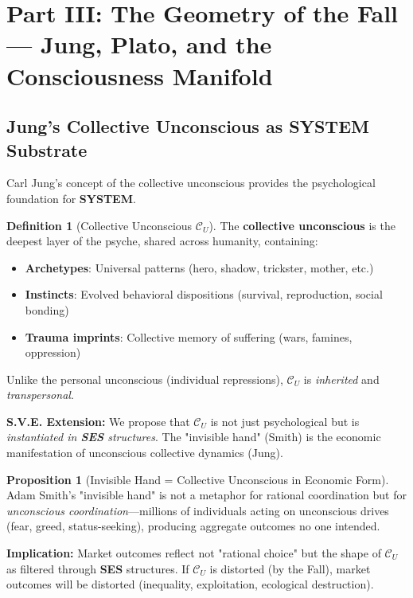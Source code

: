 \documentclass[11pt,a4paper]{article}
\newcommand{\SYSTEM}{\textbf{SYSTEM}}
\newcommand{\SES}{\textbf{SES}}
\newcommand{\CU}{$\mathcal{C}_U$}
\theoremstyle{definition}
\newtheorem{definition}{Definition}[section]
\newtheorem{proposition}{Proposition}[section]
\theoremstyle{remark}
\begin{document}

\section{Part III: The Geometry of the Fall — Jung, Plato, and the Consciousness Manifold}

\subsection{Jung's Collective Unconscious as \SYSTEM{} Substrate}

Carl Jung's concept of the collective unconscious \cite{jung_collective_unconscious} provides the psychological foundation for \SYSTEM{}.

\begin{definition}[Collective Unconscious \CU{}]
\label{def:collective_unconscious}
The \textbf{collective unconscious} is the deepest layer of the psyche, shared across humanity, containing:
\begin{itemize}
\item \textbf{Archetypes}: Universal patterns (hero, shadow, trickster, mother, etc.)
\item \textbf{Instincts}: Evolved behavioral dispositions (survival, reproduction, social bonding)
\item \textbf{Trauma imprints}: Collective memory of suffering (wars, famines, oppression)
\end{itemize}

Unlike the personal unconscious (individual repressions), \CU{} is \textit{inherited} and \textit{transpersonal}.
\end{definition}

\textbf{S.V.E. Extension:} We propose that \CU{} is not just psychological but is \textit{instantiated in \SES{} structures}. The "invisible hand" (Smith) is the economic manifestation of unconscious collective dynamics (Jung).

\begin{proposition}[Invisible Hand = Collective Unconscious in Economic Form]
\label{prop:invisible_hand_unconscious}
Adam Smith's "invisible hand" \cite{smith1776wealth} is not a metaphor for rational coordination but for \textit{unconscious coordination}—millions of individuals acting on unconscious drives (fear, greed, status-seeking), producing aggregate outcomes no one intended.

\textbf{Implication:} Market outcomes reflect not "rational choice" but the shape of \CU{} as filtered through \SES{} structures. If \CU{} is distorted (by the Fall), market outcomes will be distorted (inequality, exploitation, ecological destruction).
\end{proposition}
\end{document}
